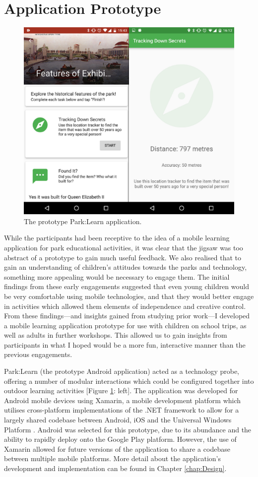 \section{Application Prototype}

\begin{figure}
  \centering
  \includegraphics[width=0.8\columnwidth]{images/chapter04/parklearnprototype.png}
  \caption{The prototype Park:Learn application.}
  \label{fig:parklearnPrototype}
\end{figure}

While the participants had been receptive to the idea of a mobile learning application for park educational activities, it was clear that the jigsaw was too abstract of a prototype to gain much useful feedback. We also realised that to gain an understanding of children’s attitudes towards the parks and technology, something more appealing would be necessary to engage them. The initial findings from these early engagements suggested that even young children would be very comfortable using mobile technologies, and that they would better engage in activities which allowed them elements of independence and creative control. From these findings---and insights gained from studying prior work---I developed a mobile learning application prototype for use with children on school trips, as well as adults in further workshops. This allowed us to gain insights from participants in what I hoped would be a more fun, interactive manner than the previous engagements.

Park:Learn (the prototype Android application) acted as a technology probe, offering a number of modular interactions which could be configured together into outdoor learning activities [Figure \ref{fig:parklearnPrototype}: left]. The application was developed for Android mobile devices using Xamarin, a mobile development platform which utilises cross-platform implementations of the .NET framework to allow for a largely shared codebase between Android, iOS and the Universal Windows Platform \citep{Xamarin2016}. Android was selected for this prototype, due to its abundance and the ability to rapidly deploy onto the Google Play platform. However, the use of Xamarin allowed for future versions of the application to share a codebase between multiple mobile platforms. More detail about the application's development and implementation can be found in Chapter \ref{chap:Design}.

